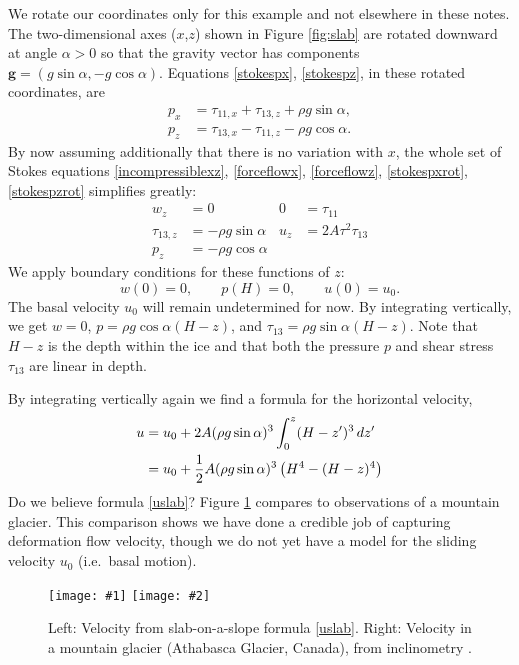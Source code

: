 \documentclass[titlepage,a4paper,final,12pt]{scrartcl}
\newcommand{\twofigsizes}[5]{
\begin{figure}[ht]
\centering
\texttt{[image: \#1]} \quad
\texttt{[image: \#2]}
\caption{#3}
\label{fig:#1}
\end{figure}}
\begin{document}
We rotate our coordinates only for this example and not elsewhere in these notes.  The two-dimensional axes ($x$,$z$) shown in Figure \ref{fig:slab} are rotated downward at angle $\alpha>0$ so that the gravity vector has components $\mathbf{g} = (g \sin\alpha,- g \cos \alpha)$.  Equations \eqref{stokespx}, \eqref{stokespz}, in these rotated coordinates, are
\begin{align}
p_x &= \tau_{11,x} + \tau_{13,z} + \rho g \sin\alpha, \label{stokespxrot} \\
p_z &= \tau_{13,x} - \tau_{11,z} - \rho g \cos\alpha. \label{stokespzrot}
\end{align}
By now assuming additionally that there is no variation with $x$, the whole set of Stokes equations \eqref{incompressiblexz}, \eqref{forceflowx}, \eqref{forceflowz}, \eqref{stokespxrot}, \eqref{stokespzrot} simplifies greatly:
\begin{align*}
w_z &= 0 &   0 &= \tau_{11} \\
\tau_{13,z} &= - \rho g \sin\alpha &   u_z &= 2 A \tau^2 \tau_{13} \\
p_z &= - \rho g \cos\alpha
\end{align*}
We apply boundary conditions for these functions of $z$:
	$$w(0)=0, \qquad p(H)=0, \qquad u(0)=u_0.$$
The basal velocity $u_0$ will remain undetermined for now.  By integrating vertically, we get $w=0$, $p = \rho g \cos\alpha (H-z)$, and $\tau_{13} = \rho g \sin\alpha (H-z)$.  Note that $H-z$ is the depth within the ice and that both the pressure $p$ and shear stress $\tau_{13}$ are linear in depth.

By integrating vertically again we find a formula for the horizontal velocity,
\begin{align}
u &= u_0 + 2 A (\rho g \sin\alpha)^3 \int_0^z (H-z')^3\,dz' \notag \\
  &= u_0 + \frac{1}{2} A (\rho g \sin\alpha)^3  \left(H^4 - (H-z)^4\right)  \label{uslab}
\end{align}
Do we believe formula \eqref{uslab}?  Figure \ref{fig:slabvel} compares to observations of a mountain glacier.  This comparison shows we have done a credible job of capturing deformation flow velocity, though we do not yet have a model for the sliding velocity $u_0$ (i.e.~basal motion).  

\twofigsizes{slabvel}{athabasca_deform}{Left:  Velocity from slab-on-a-slope formula \eqref{uslab}.  Right:  Velocity in a mountain glacier (Athabasca Glacier, Canada), from inclinometry \cite{SavagePaterson}.}{2.0in}{1.8in}
\end{document}
